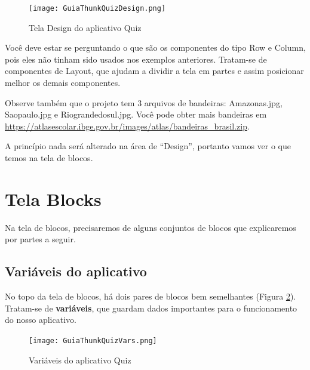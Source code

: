\documentclass[11pt,fleqn]{book} %
\begin{document}
\begin{figure}[H]
	\centering
	\texttt{[image: GuiaThunkQuizDesign.png]}\hspace{0.2cm}
    \caption{Tela Design do aplicativo Quiz}\label{fig:quizdesign}
\end{figure} 

Você deve estar se perguntando o que são os componentes do tipo Row e Column, pois eles não tinham sido usados nos exemplos anteriores. Tratam-se de componentes de Layout, que ajudam a dividir a tela em partes e assim posicionar melhor os demais componentes.

Observe também que o projeto tem 3 arquivos de bandeiras: Amazonas.jpg, Saopaulo.jpg e Riograndedosul.jpg. Você pode obter mais bandeiras em \url{https://atlasescolar.ibge.gov.br/images/atlas/bandeiras_brasil.zip}.


A princípio nada será alterado na área de ``Design'', portanto vamos ver o que temos na tela de blocos. 

\section{Tela Blocks}

Na tela de blocos, precisaremos de alguns conjuntos de blocos que explicaremos por partes a seguir.

\subsection{Variáveis do aplicativo}

No topo da tela de blocos, há dois pares de blocos bem semelhantes (Figura \ref{fig:quizvars}). Tratam-se de \textbf{variáveis}, que guardam dados importantes para o funcionamento do nosso aplicativo.

\begin{figure}[H]
	\centering
	\texttt{[image: GuiaThunkQuizVars.png]}\hspace{0.2cm}
    \caption{Variáveis do aplicativo Quiz}\label{fig:quizvars}
\end{figure} 
\end{document}
